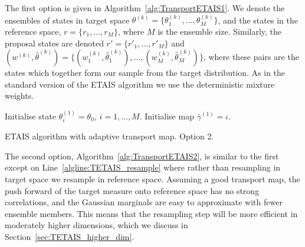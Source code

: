 \documentclass[final]{siamltex}
\begin{document}
The first option is given in Algorithm~\ref{alg:TransportETAIS1}. We
denote the ensembles of states in target space $\theta^{(k)} =
\{\theta^{(k)}_1,\dots,\theta^{(k)}_M\}$, and the states in the
reference space, $r = \{r_1,\dots,r_M\}$, where $M$ is the ensemble
size. Similarly, the proposal states are denoted $r' =
\{r'_1,\dots,r'_M\}$ and $(w^{(k)}, \hat{\theta}^{(k)}) =
\{(w^{(k)}_1, \hat{\theta}^{(k)}_1),\dots,(w^{(k)}_M,
\hat{\theta}^{(k)}_M)\}$, where these pairs are the states which
together form our sample from the target distribution. As in the standard version of the ETAIS algorithm we use the deterministic mixture weights.

\begin{table}
\begin{algorithm}[H]
\DontPrintSemicolon
\BlankLine
Initialise state $\theta^{(1)}_i = \theta_0$, \quad $i = 1,\dots,M$.\;
Initialise map $\bar{\gamma}^{(1)} = \iota$.\;
\caption{ETAIS algorithm with adaptive transport map. Option 2.\label{alg:TransportETAIS2}}
\end{algorithm}
\end{table}

The second option, Algorithm~\ref{alg:TransportETAIS2}, is similar to
the first except on Line~\ref{algline:TETAIS_resample} where rather
than resampling in target space we resample in reference
space. Assuming a good transport map, the push forward of the target
measure onto 
reference space has no strong correlations, and the
Gaussian marginals are easy to approximate with fewer ensemble
members. This means that the resampling step will be more efficient in
moderately higher dimensions, which we discuss in Section~\ref{sec:TETAIS_higher_dim}.
\end{document}
